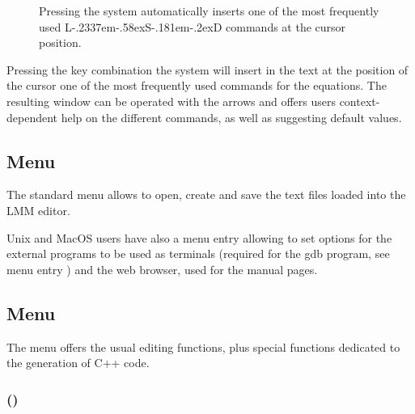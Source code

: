 \documentclass [11pt,a4paper] {book}
\def\LsD{{L\kern-.2337em\lower-.58ex\hbox{S}\kern-.181em\lower-.2ex\hbox{D}}\xspace}
\begin{document}
\begin{figure}[ht]
  \centering
  \caption{Pressing  the system automatically inserts one of the most frequently used \LsD commands at the cursor position.}
  \label{fig:LMM_script}
\end{figure}

Pressing the key combination  the system will insert in the text at the position of the cursor one of the most frequently used commands for the equations. The resulting window can be operated with the arrows and offers users context-dependent help on the different commands, as well as suggesting default values.

\subsection{Menu }

The standard menu  allows to open, create and save the text files loaded into the LMM editor. 

Unix and MacOS users have also a menu entry allowing to set options for the external programs to be used as terminals (required for the gdb program, see menu entry ) and the web browser, used for the manual pages.

\subsection{Menu }

The menu  offers the usual editing functions, plus special functions dedicated to the generation of C++ code. 

\subsubsection{ ()}
\end{document}
